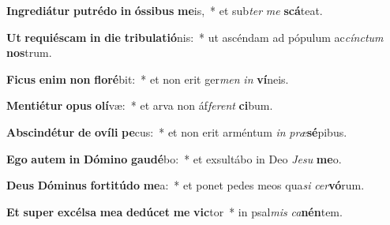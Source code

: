 \item \textbf{In}\textbf{gre}\textbf{di}\textbf{á}\textbf{tur} \textbf{pu}\textbf{tré}\textbf{do} \textbf{in} \textbf{ós}\textbf{si}\textbf{bus} \textbf{me}is,~* et sub\textit{ter} \textit{me} \textbf{scá}teat.
\item \textbf{Ut} \textbf{re}\textbf{qui}\textbf{és}\textbf{cam} \textbf{in} \textbf{di}\textbf{e} \textbf{tri}\textbf{bu}\textbf{la}\textbf{ti}\textbf{ó}nis:~* ut ascéndam ad pópulum ac\textit{cínc}\textit{tum} \textbf{nos}trum.
\item \textbf{Fi}\textbf{cus} \textbf{e}\textbf{nim} \textbf{non} \textbf{flo}\textbf{ré}bit:~* et non erit ger\textit{men} \textit{in} \textbf{ví}neis.
\item \textbf{Men}\textbf{ti}\textbf{é}\textbf{tur} \textbf{o}\textbf{pus} \textbf{o}\textbf{lí}væ:~* et arva non áf\textit{fe}\textit{rent} \textbf{ci}bum.
\item \textbf{Ab}\textbf{scin}\textbf{dé}\textbf{tur} \textbf{de} \textbf{o}\textbf{ví}\textbf{li} \textbf{pe}cus:~* et non erit arméntum \textit{in} \textit{præ}\textbf{sé}pibus.
\item \textbf{E}\textbf{go} \textbf{au}\textbf{tem} \textbf{in} \textbf{Dó}\textbf{mi}\textbf{no} \textbf{gau}\textbf{dé}bo:~* et exsultábo in Deo \textit{Je}\textit{su} \textbf{me}o.
\item \textbf{De}\textbf{us} \textbf{Dó}\textbf{mi}\textbf{nus} \textbf{for}\textbf{ti}\textbf{tú}\textbf{do} \textbf{me}a:~* et ponet pedes meos qua\textit{si} \textit{cer}\textbf{vó}rum.
\item \textbf{Et} \textbf{su}\textbf{per} \textbf{ex}\textbf{cél}\textbf{sa} \textbf{me}\textbf{a} \textbf{de}\textbf{dú}\textbf{cet} \textbf{me} \textbf{vic}tor~* in psal\textit{mis} \textit{ca}\textbf{nén}tem.
